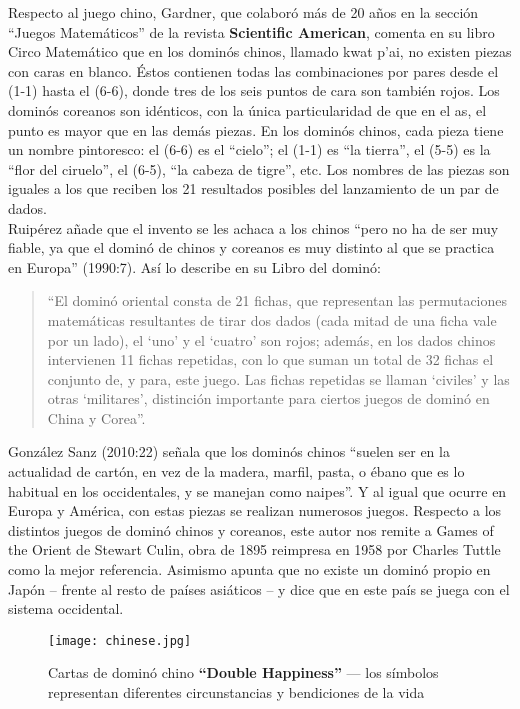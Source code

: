 Respecto al juego chino, Gardner, que colaboró más de 20 años en la sección “Juegos Matemáticos” de
la revista \textbf{Scientific American}, comenta en su libro Circo Matemático que en los dominós chinos,
llamado kwat p’ai, no existen piezas con caras en blanco. Éstos contienen todas las combinaciones
por pares desde el (1-1)  hasta el (6-6), donde tres de los seis puntos de cara son también rojos.
Los dominós coreanos son idénticos, con la única particularidad de que en el as, el punto es mayor
que en las demás piezas. En los dominós chinos, cada pieza tiene un nombre pintoresco: el (6-6)
es el “cielo”; el (1-1) es “la tierra”, el (5-5) es la “flor del ciruelo”, el (6-5), “la cabeza de
tigre”, etc. Los nombres de las piezas son iguales a los que reciben los 21 resultados posibles del
lanzamiento de un par de dados. \\

Ruipérez añade que el invento se les achaca a los chinos “pero no ha de ser muy fiable, ya que el
dominó de chinos y coreanos es muy distinto al que se practica en Europa” (1990:7). Así lo describe
en su Libro del dominó:

\begin{quote}
“El dominó oriental consta de 21 fichas, que representan las permutaciones matemáticas resultantes
de tirar dos dados (cada mitad de una ficha vale por un lado), el ‘uno’ y el ‘cuatro’ son rojos;
además, en los dados chinos intervienen 11 fichas repetidas, con lo que suman un total de 32 fichas
el conjunto de, y para, este juego. Las fichas repetidas se llaman ‘civiles’ y las otras ‘militares’,
distinción importante para ciertos juegos de dominó en China y Corea”.
\end{quote}

González Sanz (2010:22) señala que los dominós chinos “suelen ser en la actualidad de cartón, en vez
de la madera, marfil, pasta, o ébano que es lo habitual en los occidentales, y se manejan como naipes”.
Y al igual que ocurre en Europa y América, con estas piezas se realizan numerosos juegos. Respecto a
los distintos juegos de dominó chinos y coreanos, este autor nos remite a Games of the Orient de Stewart
Culin, obra de 1895 reimpresa en 1958 por Charles Tuttle como la mejor referencia. Asimismo apunta que
no existe un dominó propio en Japón – frente al resto de países asiáticos – y dice que en este país se
juega con el sistema occidental. \\

\begin{figure}[h]
  \label{}
  \begin{center}
    \texttt{[image: chinese.jpg]}
  \end{center}
  \caption{Cartas de dominó chino \textbf{“Double Happiness”} --- los símbolos representan diferentes
            circunstancias y bendiciones de la vida }
\end{figure}

